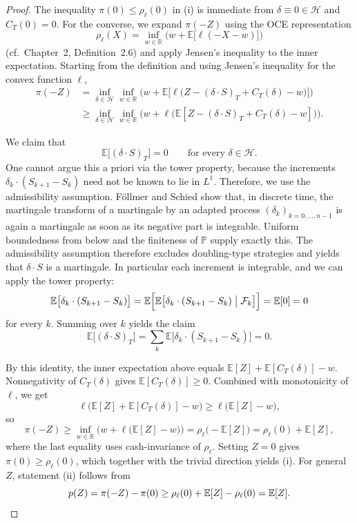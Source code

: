 \documentclass[11pt,a4paper]{report}
\numberwithin{equation}{chapter}
\theoremstyle{plain}
\theoremstyle{definition}
\newcommand{\E}{\mathbb{E}}
\newcommand{\PP}{\mathbb{P}}
\newcommand{\R}{\mathbb{R}}
\newcommand{\F}{\mathcal{F}}
\newcommand{\HH}{\mathcal{H}}
\begin{document}
\begin{proof}
    The inequality $\pi(0)\le\rho_\ell(0)$ in (i) is immediate from $\delta\equiv0\in\HH$ and $C_T(0)=0$. For the converse, we expand $\pi(-Z)$ using the OCE representation
    \[
        \rho_\ell(X)=\inf_{w\in\R}\Big(w+\E\bigl[\ell(-X-w)\bigr]\Big)
    \]
    (cf.\ Chapter~2, Definition~2.6) and apply Jensen's inequality to the inner expectation. Starting from the definition and using Jensen's inequality for the convex function $\ell$,
    \begin{align*}
        \pi(-Z) & =\inf_{\delta\in\HH}\inf_{w\in\R}\Big(w+\E\bigl[\ell\bigl(Z-(\delta\cdot S)_T+C_T(\delta)-w\bigr)\bigr]\Big) \\
                & \ge\inf_{\delta\in\HH}\inf_{w\in\R}\Big(w+\ell\bigl(\E[Z-(\delta\cdot S)_T+C_T(\delta)-w]\bigr)\Big).
    \end{align*}

    We claim that
    \[
        \E\bigl[(\delta\cdot S)_T\bigr]=0\qquad\text{for every }\delta\in\HH.
    \]
    One cannot argue this a priori via the tower property, because the
    increments $\delta_k\cdot(S_{k+1}-S_k)$ need not be known to lie in
    $L^1$. Therefore, we use the admissibility assumption. F\"ollmer and
    Schied \cite[Proposition~9.6]{foellmerschied} show that, in discrete
    time, the martingale transform of a martingale by an adapted process
    $(\delta_k)_{k=0,\dots,n-1}$ is again a martingale as soon as its
    negative part is integrable. Uniform boundedness from below and the finiteness of $\PP$ supply
    exactly this.
    The admissibility assumption therefore excludes doubling-type
    strategies and yields that $\delta\cdot S$ is a martingale. In
    particular each increment is integrable, and we can apply the tower
    property:
    \[
        \E\bigl[\delta_k\cdot(S_{k+1}-S_k)\bigr]
        =\E\Bigl[\E\bigl[\delta_k\cdot(S_{k+1}-S_k)\bigm|\F_k\bigr]\Bigr]
        =\E[0]=0
    \]
    for every $k$. Summing over $k$ yields the claim
    \[
        \E\bigl[(\delta\cdot S)_T\bigr]
        =\sum_k\E\bigl[\delta_k\cdot(S_{k+1}-S_k)\bigr]
        =0.
    \]

    By this identity, the inner expectation above equals $\E[Z]+\E[C_T(\delta)]-w$. Nonnegativity of $C_T(\delta)$ gives $\E[C_T(\delta)]\ge0$. Combined with monotonicity of $\ell$, we get
    \[
        \ell\bigl(\E[Z]+\E[C_T(\delta)]-w\bigr)\ge\ell\bigl(\E[Z]-w\bigr),
    \]
    so
    \[
        \pi(-Z)\ge\inf_{w\in\R}\Big(w+\ell\bigl(\E[Z]-w\bigr)\Big)=\rho_\ell\bigl(-\E[Z]\bigr)=\rho_\ell(0)+\E[Z],
    \]
    where the last equality uses cash-invariance of $\rho_\ell$. Setting $Z=0$ gives $\pi(0)\ge\rho_\ell(0)$, which together with the trivial direction yields (i). For general $Z$, statement (ii) follows from
    \[
        p(Z)=\pi(-Z)-\pi(0)\ge\rho_\ell(0)+\E[Z]-\rho_\ell(0)=\E[Z].\qedhere
    \]
\end{proof}
\end{document}
